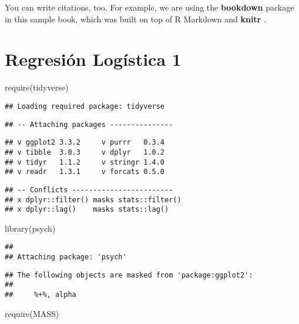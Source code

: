 \documentclass[
]{book}
\newenvironment{Shaded}{\begin{snugshade}}{\end{snugshade}}
\newcommand{\FunctionTok}[1]{\textcolor[rgb]{0.00,0.00,0.00}{#1}}
\newcommand{\NormalTok}[1]{#1}
\begin{document}
You can write citations, too. For example, we are using the \textbf{bookdown} package \citep{R-bookdown} in this sample book, which was built on top of R Markdown and \textbf{knitr} \citep{xie2015}.

\hypertarget{regresiuxf3n-loguxedstica-1}{%
\chapter{Regresión Logística 1}\label{regresiuxf3n-loguxedstica-1}}

\begin{Shaded}
\begin{Highlighting}[]
\FunctionTok{require}\NormalTok{(tidyverse)}
\end{Highlighting}
\end{Shaded}

\begin{verbatim}
## Loading required package: tidyverse
\end{verbatim}

\begin{verbatim}
## -- Attaching packages ---------------
\end{verbatim}

\begin{verbatim}
## v ggplot2 3.3.2     v purrr   0.3.4
## v tibble  3.0.3     v dplyr   1.0.2
## v tidyr   1.1.2     v stringr 1.4.0
## v readr   1.3.1     v forcats 0.5.0
\end{verbatim}

\begin{verbatim}
## -- Conflicts ------------------------
## x dplyr::filter() masks stats::filter()
## x dplyr::lag()    masks stats::lag()
\end{verbatim}

\begin{Shaded}
\begin{Highlighting}[]
\FunctionTok{library}\NormalTok{(psych)}
\end{Highlighting}
\end{Shaded}

\begin{verbatim}
## 
## Attaching package: 'psych'
\end{verbatim}

\begin{verbatim}
## The following objects are masked from 'package:ggplot2':
## 
##     %+%, alpha
\end{verbatim}

\begin{Shaded}
\begin{Highlighting}[]
\FunctionTok{require}\NormalTok{(MASS)}
\end{Highlighting}
\end{Shaded}
\end{document}

